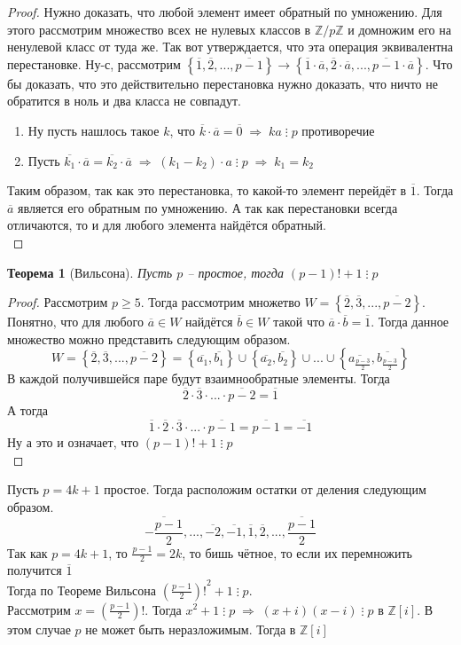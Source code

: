 \documentclass[12pt, a4paper]{article}
\newcommand{\ra}{\;\Rightarrow\;}
\newcommand{\Z}{\mathds{Z}}
\newcommand{\bo}{\geqslant}
\newcommand{\cl}[1]{\overline{#1}}
\theoremstyle{plain}
\newtheorem*{Th*}{Теорема}
\theoremstyle{definition}
\begin{document}
\begin{proof}
    Нужно доказать, что любой элемент имеет обратный по умножению. Для этого рассмотрим множество всех не нулевых классов в $\Z/p\Z$ и домножим его на ненулевой класс от туда же. Так вот утверждается, что эта операция эквивалентна перестановке.
    Ну-с, рассмотрим $\left\{\cl{1},\cl{2},...,\cl{p-1}\right\}\to \left\{\cl{1}\cdot\cl{a},\cl{2}\cdot\cl{a},...,\cl{p-1}\cdot\cl{a}\right\}$. Что бы доказать, что это действительно перестановка
    нужно доказать, что ничто не обратится в ноль и два класса не совпадут.
    \begin{enumerate}
        \item Ну пусть нашлось такое $k$, что $\cl{k}\cdot\cl{a} = \cl{0} \ra ka\;\vdots\; p$ противоречие
        \item Пусть $\cl{k_1}\cdot\cl{a} = \cl{k_2}\cdot\cl{a} \ra (k_1-k_2)\cdot a\;\vdots\; p \ra k_1=k_2$
    \end{enumerate}
    Таким образом, так как это перестановка, то какой-то элемент перейдёт в $\cl{1}$. Тогда $\cl{a}$ является его обратным по умножению. А так как перестановки всегда отличаются, то и для любого элемента найдётся обратный.\\
\end{proof}
\begin{Th*}[Вильсона]
    Пусть $p$ -- простое, тогда $(p-1)! + 1\; \vdots \; p$
\end{Th*}
\begin{proof}
    Рассмотрим $p \bo 5$. Тогда рассмотрим множетво $W = \left\{\cl{2},\cl{3},...,\cl{p-2}\right\}$. Понятно, что для любого $\cl{a}\in W$ найдётся $\cl{b}\in W$ такой что $\cl{a}\cdot\cl{b} = \cl{1}$.
    Тогда данное множество можно представить следующим образом.
    \[W = \left\{\cl{2},\cl{3},...,\cl{p-2}\right\} = \left\{\cl{a_1},\cl{b_1}\right\}\cup\left\{\cl{a_2}, \cl{b_2}\right\}\cup...\cup\left\{\cl{a_{\frac{p-3}{2}}},\cl{b_{\frac{p-3}{2}}}\right\}\]
    В каждой получившейся паре будут взаимнообратные элементы. Тогда 
    \[\cl{2}\cdot\cl{3}\cdot...\cdot\cl{p-2} = \cl{1}\]
    А тогда
    \[\cl{1}\cdot\cl{2}\cdot\cl{3}\cdot...\cdot\cl{p-1} = \cl{p-1} = \cl{-1}\]
    Ну а это и означает, что $(p-1)!+1\;\vdots\; p$\\
\end{proof}
\noindent Пусть $p=4k+1$ простое. Тогда расположим остатки от деления следующим образом.
\[\cl{-\frac{p-1}{2}},...,\cl{-2},\cl{-1},\cl{1},\cl{2},...,\cl{\frac{p-1}{2}}\]
Так как $p=4k+1$, то $\frac{p-1}{2} = 2k$, то бишь чётное, то если их перемножить получится $\cl{1}$
\\
Тогда по Теореме Вильсона ${(\frac{p-1}{2})!}^2+1\;\vdots\; p$. 
\\Рассмотрим $x = (\frac{p-1}{2})!$. Тогда $x^2+1\;\vdots \; p\ra (x+i)(x-i)\;\vdots\;p \text{ в }\Z[i]$. В этом случае $p$ не может быть неразложимым. Тогда в $\Z[i]$
\end{document}
